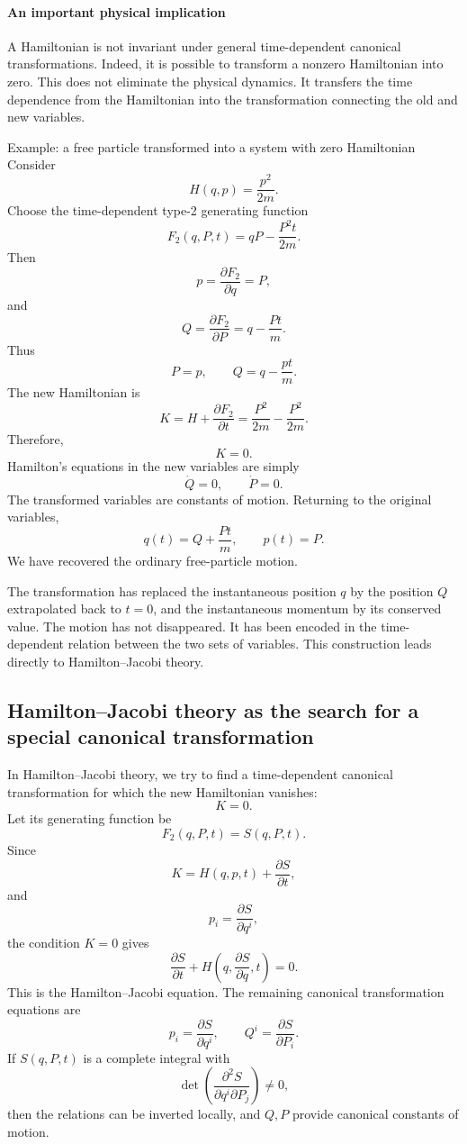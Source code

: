 \paragraph{An important physical implication} A Hamiltonian is not invariant
under general time-dependent canonical transformations. Indeed, it is possible
to transform a nonzero Hamiltonian into zero. This does not eliminate the
physical dynamics. It transfers the time dependence from the Hamiltonian into
the transformation connecting the old and new variables.

Example: a free particle transformed into a system with zero Hamiltonian
Consider
\[
H(q,p)=\frac{p^2}{2m}.
\]
Choose the time-dependent type-2 generating function
\[
\boxed{
F_2(q,P,t)=qP-\frac{P^2t}{2m}.
}
\]
Then
\[
p=\frac{\partial F_2}{\partial q}=P,
\]
and
\[
Q=\frac{\partial F_2}{\partial P}
=q-\frac{Pt}{m}.
\]
Thus
\[
\boxed{
P=p,\qquad Q=q-\frac{pt}{m}.
}
\]
The new Hamiltonian is
\[
K
=H+\frac{\partial F_2}{\partial t}
=\frac{P^2}{2m}-\frac{P^2}{2m}.
\]
Therefore,
\[
\boxed{K=0.}
\]
Hamilton's equations in the new variables are simply
\[
\dot Q=0,\qquad \dot P=0.
\]
The transformed variables are constants of motion.
Returning to the original variables,
\[
q(t)=Q+\frac{Pt}{m},
\qquad
p(t)=P.
\]
We have recovered the ordinary free-particle motion.

The transformation has replaced the instantaneous position \(q\) by the
position \(Q\) extrapolated back to \(t=0\), and the instantaneous momentum by
its conserved value. The motion has not disappeared. It has been encoded in the
time-dependent relation between the two sets of variables. This construction
leads directly to Hamilton–Jacobi theory.

\subsection{Hamilton–Jacobi theory as the search for a special canonical transformation}
In Hamilton–Jacobi theory, we try to find a time-dependent canonical
transformation for which the new Hamiltonian vanishes:
\[
K=0.
\]
Let its generating function be
\[
F_2(q,P,t)=S(q,P,t).
\]
Since
\[
K=H(q,p,t)+\frac{\partial S}{\partial t},
\]
and
\[
p_i=\frac{\partial S}{\partial q^i},
\]
the condition \(K=0\) gives
\[
\boxed{
\frac{\partial S}{\partial t}
+
H\left(q,\frac{\partial S}{\partial q},t\right)
=0.
}
\]
This is the Hamilton–Jacobi equation.
The remaining canonical transformation equations are
\[
\boxed{
p_i=\frac{\partial S}{\partial q^i},
\qquad
Q^i=\frac{\partial S}{\partial P_i}.
}
\]
If \(S(q,P,t)\) is a complete integral with
\[
\det
\left(
\frac{\partial^2 S}{\partial q^i\partial P_j}
\right)\ne0,
\]
then the relations can be inverted locally, and \(Q,P\) provide canonical
constants of motion.

